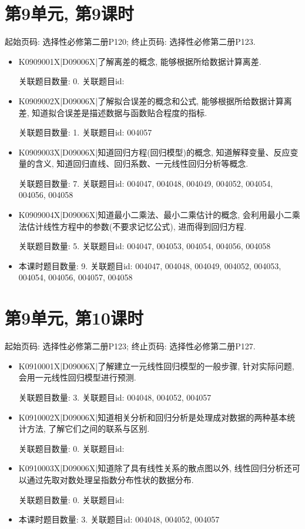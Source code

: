 \section*{第9单元, 第9课时}
起始页码: 选择性必修第二册P120; 终止页码: 选择性必修第二册P123.
\begin{itemize}
\item K0909001X|D09006X|了解离差的概念, 能够根据所给数据计算离差.

关联题目数量: 0. 关联题目id: 

\item K0909002X|D09006X|了解拟合误差的概念和公式, 能够根据所给数据计算离差, 知道拟合误差是描述数据与函数贴合程度的指标.

关联题目数量: 1. 关联题目id: 004057

\item K0909003X|D09006X|知道回归方程(回归模型)的概念, 知道解释变量、反应变量的含义, 知道回归直线、回归系数、一元线性回归分析等概念.

关联题目数量: 7. 关联题目id: 004047, 004048, 004049, 004052, 004054, 004056, 004058

\item K0909004X|D09006X|知道最小二乘法、最小二乘估计的概念, 会利用最小二乘法估计线性方程中的参数(不要求记忆公式), 进而得到回归方程.

关联题目数量: 5. 关联题目id: 004047, 004053, 004054, 004056, 004058

\item 本课时题目数量: 9. 关联题目id: 004047, 004048, 004049, 004052, 004053, 004054, 004056, 004057, 004058

\end{itemize}

\section*{第9单元, 第10课时}
起始页码: 选择性必修第二册P123; 终止页码: 选择性必修第二册P127.
\begin{itemize}
\item K0910001X|D09006X|了解建立一元线性回归模型的一般步骤, 针对实际问题, 会用一元线性回归模型进行预测.

关联题目数量: 3. 关联题目id: 004048, 004052, 004057

\item K0910002X|D09006X|知道相关分析和回归分析是处理成对数据的两种基本统计方法, 了解它们之间的联系与区别.

关联题目数量: 0. 关联题目id: 

\item K0910003X|D09006X|知道除了具有线性关系的散点图以外, 线性回归分析还可以通过先取对数处理呈指数分布性状的数据分布.

关联题目数量: 0. 关联题目id: 

\item 本课时题目数量: 3. 关联题目id: 004048, 004052, 004057

\end{itemize}

